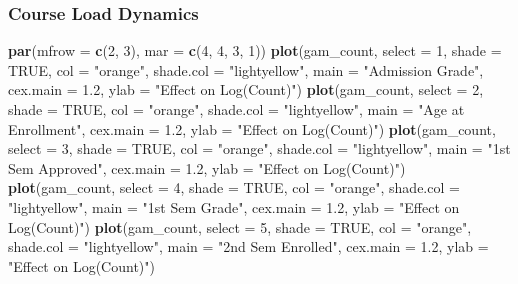 \documentclass[
]{article}
\newenvironment{Shaded}{\begin{snugshade}}{\end{snugshade}}
\newcommand{\AttributeTok}[1]{\textcolor[rgb]{0.13,0.29,0.53}{#1}}
\newcommand{\ConstantTok}[1]{\textcolor[rgb]{0.56,0.35,0.01}{#1}}
\newcommand{\DecValTok}[1]{\textcolor[rgb]{0.00,0.00,0.81}{#1}}
\newcommand{\FloatTok}[1]{\textcolor[rgb]{0.00,0.00,0.81}{#1}}
\newcommand{\FunctionTok}[1]{\textcolor[rgb]{0.13,0.29,0.53}{\textbf{#1}}}
\newcommand{\NormalTok}[1]{#1}
\newcommand{\StringTok}[1]{\textcolor[rgb]{0.31,0.60,0.02}{#1}}
\begin{document}
\subsubsection{Course Load Dynamics}\label{course-load-dynamics}

\begin{Shaded}
\begin{Highlighting}[]
\FunctionTok{par}\NormalTok{(}\AttributeTok{mfrow =} \FunctionTok{c}\NormalTok{(}\DecValTok{2}\NormalTok{, }\DecValTok{3}\NormalTok{), }\AttributeTok{mar =} \FunctionTok{c}\NormalTok{(}\DecValTok{4}\NormalTok{, }\DecValTok{4}\NormalTok{, }\DecValTok{3}\NormalTok{, }\DecValTok{1}\NormalTok{))}
\FunctionTok{plot}\NormalTok{(gam\_count, }\AttributeTok{select =} \DecValTok{1}\NormalTok{, }\AttributeTok{shade =} \ConstantTok{TRUE}\NormalTok{, }\AttributeTok{col =} \StringTok{"orange"}\NormalTok{, }\AttributeTok{shade.col =} \StringTok{"lightyellow"}\NormalTok{,}
     \AttributeTok{main =} \StringTok{"Admission Grade"}\NormalTok{, }\AttributeTok{cex.main =} \FloatTok{1.2}\NormalTok{, }\AttributeTok{ylab =} \StringTok{"Effect on Log(Count)"}\NormalTok{)}
\FunctionTok{plot}\NormalTok{(gam\_count, }\AttributeTok{select =} \DecValTok{2}\NormalTok{, }\AttributeTok{shade =} \ConstantTok{TRUE}\NormalTok{, }\AttributeTok{col =} \StringTok{"orange"}\NormalTok{, }\AttributeTok{shade.col =} \StringTok{"lightyellow"}\NormalTok{,}
     \AttributeTok{main =} \StringTok{"Age at Enrollment"}\NormalTok{, }\AttributeTok{cex.main =} \FloatTok{1.2}\NormalTok{, }\AttributeTok{ylab =} \StringTok{"Effect on Log(Count)"}\NormalTok{)}
\FunctionTok{plot}\NormalTok{(gam\_count, }\AttributeTok{select =} \DecValTok{3}\NormalTok{, }\AttributeTok{shade =} \ConstantTok{TRUE}\NormalTok{, }\AttributeTok{col =} \StringTok{"orange"}\NormalTok{, }\AttributeTok{shade.col =} \StringTok{"lightyellow"}\NormalTok{,}
     \AttributeTok{main =} \StringTok{"1st Sem Approved"}\NormalTok{, }\AttributeTok{cex.main =} \FloatTok{1.2}\NormalTok{, }\AttributeTok{ylab =} \StringTok{"Effect on Log(Count)"}\NormalTok{)}
\FunctionTok{plot}\NormalTok{(gam\_count, }\AttributeTok{select =} \DecValTok{4}\NormalTok{, }\AttributeTok{shade =} \ConstantTok{TRUE}\NormalTok{, }\AttributeTok{col =} \StringTok{"orange"}\NormalTok{, }\AttributeTok{shade.col =} \StringTok{"lightyellow"}\NormalTok{,}
     \AttributeTok{main =} \StringTok{"1st Sem Grade"}\NormalTok{, }\AttributeTok{cex.main =} \FloatTok{1.2}\NormalTok{, }\AttributeTok{ylab =} \StringTok{"Effect on Log(Count)"}\NormalTok{)}
\FunctionTok{plot}\NormalTok{(gam\_count, }\AttributeTok{select =} \DecValTok{5}\NormalTok{, }\AttributeTok{shade =} \ConstantTok{TRUE}\NormalTok{, }\AttributeTok{col =} \StringTok{"orange"}\NormalTok{, }\AttributeTok{shade.col =} \StringTok{"lightyellow"}\NormalTok{,}
     \AttributeTok{main =} \StringTok{"2nd Sem Enrolled"}\NormalTok{, }\AttributeTok{cex.main =} \FloatTok{1.2}\NormalTok{, }\AttributeTok{ylab =} \StringTok{"Effect on Log(Count)"}\NormalTok{)}
\end{Highlighting}
\end{Shaded}
\end{document}
